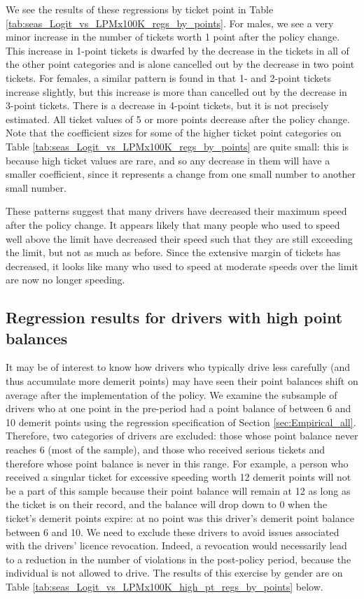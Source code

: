 


We see the results of these regressions by ticket point in 
Table \ref{tab:seas_Logit_vs_LPMx100K_regs_by_points}. 
For males, we see a very minor increase in the number of tickets 
worth 1 point after the policy change. 
This increase in 1-point tickets is dwarfed by the decrease in the tickets 
in all of the other point categories and is alone cancelled out 
by the decrease in two point tickets. 
For females, a similar pattern is found in that 1- and 2-point tickets increase slightly,
but this increase is more than cancelled out by the decrease in 3-point tickets. 
There is a decrease in 4-point tickets, but it is not precisely estimated. 
All ticket values of 5 or more points decrease after the policy change. 
Note that the coefficient sizes for some of the higher ticket point categories on 
Table \ref{tab:seas_Logit_vs_LPMx100K_regs_by_points}
are quite small: 
this is because high ticket values are rare, 
and so any decrease in them will have a smaller coefficient, 
since it represents a change from one small number to another small number.

These patterns suggest that many drivers have decreased their maximum speed 
after the policy change. 
It appears likely that many people who used to speed well above the limit 
have decreased their speed such that they are still exceeding the limit, 
but not as much as before. 
Since the extensive margin of tickets has decreased, 
it looks like many who used to speed at moderate speeds over the limit 
are now no longer speeding.


\subsection{Regression results for drivers with high point balances}
\label{sec:Empirical_high_pts}

It may be of interest to know how drivers who typically drive less carefully 
(and thus accumulate more demerit points) 
may have seen their point balances shift on average after the implementation of the policy. 
We examine the subsample of drivers who at one point in the pre-period 
had a point balance of between 6 and 10 demerit points 
using the regression specification of 
Section \ref{sec:Empirical_all}. 
Therefore, two categories of drivers are excluded: 
those whose point balance never reaches 6 (most of the sample), 
and those who received serious tickets and therefore whose point balance is never in this range. 
For example, a person who received a singular ticket for excessive speeding worth 12 demerit points 
will not be a part of this sample because their point balance will remain at 12 
as long as the ticket is on their record, 
and the balance will drop down to 0 when the ticket’s demerit points expire: 
at no point was this driver’s demerit point balance between 6 and 10. 
We need to exclude these drivers to avoid issues associated with the drivers’ licence revocation. 
Indeed, a revocation would necessarily lead to a reduction in the number of violations 
in the post-policy period, because the individual is not allowed to drive. 
The results of this exercise by gender are on 
Table \ref{tab:seas_Logit_vs_LPMx100K_high_pt_regs_by_points} below. 

